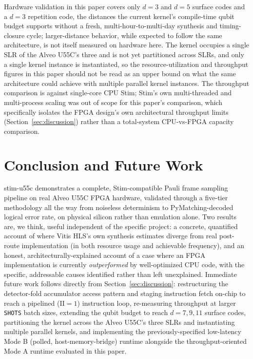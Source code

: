 \documentclass[pdflatex,sn-basic]{sn-jnl}
\begin{document}
Hardware validation in this paper covers only $d=3$ and $d=5$ surface codes and a $d=3$ repetition code, the distances the current kernel's compile-time qubit budget supports without a fresh, multi-hour-to-multi-day synthesis and timing-closure cycle; larger-distance behavior, while expected to follow the same architecture, is not itself measured on hardware here. The kernel occupies a single SLR of the Alveo U55C's three and is not yet partitioned across SLRs, and only a single kernel instance is instantiated, so the resource-utilization and throughput figures in this paper should not be read as an upper bound on what the same architecture could achieve with multiple parallel kernel instances. The throughput comparison is against single-core CPU Stim; Stim's own multi-threaded and multi-process scaling was out of scope for this paper's comparison, which specifically isolates the FPGA design's own architectural throughput limits (Section~\ref{sec:discussion}) rather than a total-system CPU-vs-FPGA capacity comparison.

\section{Conclusion and Future Work}\label{sec:conclusion}

stim-u55c demonstrates a complete, Stim-compatible Pauli frame sampling pipeline on real Alveo U55C FPGA hardware, validated through a five-tier methodology all the way from noiseless determinism to PyMatching-decoded logical error rate, on physical silicon rather than emulation alone. Two results are, we think, useful independent of the specific project: a concrete, quantified account of where Vitis HLS's own synthesis estimates diverge from real post-route implementation (in both resource usage and achievable frequency), and an honest, architecturally-explained account of a case where an FPGA implementation is currently \emph{outperformed} by well-optimized CPU code, with the specific, addressable causes identified rather than left unexplained. Immediate future work follows directly from Section~\ref{sec:discussion}: restructuring the detector-fold accumulator access pattern and staging instruction fetch on-chip to reach a pipelined (II$=1$) instruction loop, re-measuring throughput at larger \texttt{SHOTS} batch sizes, extending the qubit budget to reach $d=7,9,11$ surface codes, partitioning the kernel across the Alveo U55C's three SLRs and instantiating multiple parallel kernels, and implementing the previously-specified low-latency Mode B (polled, host-memory-bridge) runtime alongside the throughput-oriented Mode A runtime evaluated in this paper.
\end{document}

